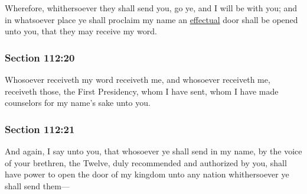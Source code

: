 		Wherefore, whithersoever they shall send you, go ye, and I will be with you; and in whatsoever place ye shall proclaim my name an \hyperref[EFFECTUAL]{effectual} door shall be opened unto you, that they may receive my word.


	\subsubsection{Section 112:20} %
		\label{DC112-20}

		Whosoever receiveth my word receiveth me, and whosoever receiveth me, receiveth those, the First Presidency, whom I have sent, whom I have made counselors for my name's sake unto you.


	\subsubsection{Section 112:21} %
		\label{DC112-21}

		And again, I say unto you, that whosoever ye shall send in my name, by the voice of your brethren, the Twelve, duly recommended and authorized by you, shall have power to open the door of my kingdom unto any nation whithersoever ye shall send them---


